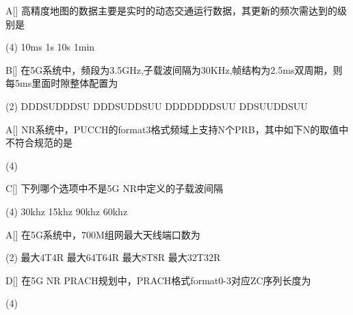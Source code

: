 \begin{choice}{A}[]
    高精度地图的数据主要是实时的动态交通运行数据，其更新的频次需达到的级别是
    \begin{tasks}(4)
        \task 10ms
        \task 1s
        \task 10s
        \task 1min
    \end{tasks}
\end{choice}


\begin{choice}{B}[]
    在5G系统中，频段为3.5GHz,子载波间隔为30KHz,帧结构为2.5ms双周期，则每5ms里面时隙整体配置为
    \begin{tasks}(2)
        \task DDDSUDDDSU
        \task DDDSUDDSUU
        \task DDDDDDDSUU
        \task DDSUUDDSUU
    \end{tasks}
\end{choice}


\begin{choice}{A}[]
    NR系统中，PUCCH的format3格式频域上支持N个PRB，其中如下N的取值中不符合规范的是
    \begin{tasks}(4)
    \end{tasks}
\end{choice}

\begin{choice}{C}[]
    下列哪个选项中不是5G NR中定义的子载波间隔
    \begin{tasks}(4)
        \task 30khz
        \task 15khz
        \task 90khz
        \task 60khz
    \end{tasks}
\end{choice}

\begin{choice}{A}[]
    在5G系统中，700M组网最大天线端口数为
    \begin{tasks}(2)
        \task 最大4T4R
        \task 最大64T64R
        \task 最大8T8R
        \task 最大32T32R
    \end{tasks}
\end{choice}



\begin{choice}{D}[]
    在5G NR PRACH规划中，PRACH格式format0-3对应ZC序列长度为
    \begin{tasks}(4)
    \end{tasks}
\end{choice}

